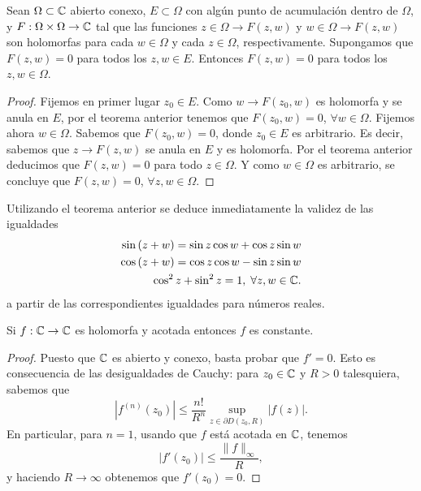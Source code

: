 \begin{colorary}
Sean $\displaystyle \Omega\subset \mathbb{C} $ abierto conexo, $\displaystyle E \subset \Omega  $ con algún punto de acumulación dentro de $\displaystyle \Omega  $, y $\displaystyle F : \Omega \times \Omega \to \mathbb{C} $ tal que las funciones $\displaystyle z \in \Omega \to F\left(z,w\right) $ y $\displaystyle w \in \Omega \to F\left(z,w\right) $ son holomorfas para cada $\displaystyle w \in \Omega  $ y cada $\displaystyle z \in \Omega  $, respectivamente. 
Supongamos que $\displaystyle F\left(z,w\right)=0 $ para todos los $\displaystyle z,w\in E $. Entonces $\displaystyle F\left(z,w\right)=0 $ para todos los $\displaystyle z,w\in \Omega  $.
\end{colorary}
\begin{proof}
Fijemos en primer lugar $\displaystyle z_{0} \in E $. Como $\displaystyle w \to F\left(z_{0}, w\right) $ es holomorfa y se anula en $\displaystyle E $, por el teorema anterior tenemos que $\displaystyle F\left(z_{0}, w\right)=0 $, $\displaystyle \forall w \in \Omega  $. Fijemos ahora $\displaystyle w \in \Omega  $. Sabemos que $\displaystyle F\left(z_{0}, w\right)=0 $, donde $\displaystyle z_{0} \in E $ es arbitrario. 
Es decir, sabemos que $\displaystyle z \to F\left(z,w\right) $ se anula en $\displaystyle E $ y es holomorfa. Por el teorema anterior deducimos que $\displaystyle F\left(z,w\right)=0 $ para todo $\displaystyle z \in \Omega  $. Y como $\displaystyle w \in \Omega  $ es arbitrario, se concluye que $\displaystyle F\left(z,w\right)=0 $, $\displaystyle \forall z,w \in \Omega $. 
\end{proof}
\begin{eg}
Utilizando el teorema anterior se deduce inmediatamente la validez de las igualdades
\[
\begin{split}
 \sin\left(z + w\right)=\sin z \cos w + \cos z \sin w \\
 \cos\left(z + w\right)=\cos z \cos w - \sin z \sin w \\
 \cos ^{2}z + \sin ^{2}z = 1 , \; \forall z,w\in \mathbb{C}.
\end{split}
\]
a partir de las correspondientes igualdades para números reales.
\end{eg}
\begin{theorem}
Si $\displaystyle f : \mathbb{C} \to \mathbb{C} $ es holomorfa y acotada entonces $\displaystyle f $ es constante. 
\end{theorem}
\begin{proof}
Puesto que $\displaystyle \mathbb{C} $ es abierto y conexo, basta probar que $\displaystyle f' = 0 $. Esto es consecuencia de las desigualdades de Cauchy: para $\displaystyle z_{0}\in \mathbb{C} $ y $\displaystyle R > 0 $ talesquiera, sabemos que
\[ \left|f^{\left(n\right)}\left(z_{0}\right)\right|\leq \frac{n!}{R^{n}}\sup_{z\in \partial D\left(z_{0}, R\right)} \left|f\left(z\right)\right| .\]
En particular, para $\displaystyle n = 1 $, usando que $\displaystyle f $ está acotada en $\displaystyle \mathbb{C} $, tenemos 
\[ \left|f'\left(z_{0}\right)\right|\leq \frac{\|f\|_{\infty }}{R} ,\]
y haciendo $\displaystyle R \to \infty $ obtenemos que $\displaystyle f'\left(z_{0}\right)=0 $.
\end{proof}
